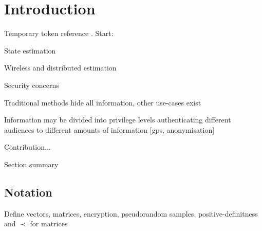 \documentclass[conference]{IEEEtran}
\theoremstyle{definition}
\theoremstyle{definition}
\theoremstyle{remark}
\begin{document}

\IEEEpeerreviewmaketitle

% 
%                                                        
%                                                        
%                                                        
% 

\section{Introduction}
Temporary token reference \cite{katzIntroductionModernCryptography2008}. Start:

State estimation

Wireless and distributed estimation

Security concerns

Traditional methods hide all information, other use-cases exist

Information may be divided into privilege levels authenticating different audiences to different amounts of information [gps, anonymisation]

Contribution...

Section summary

\subsection{Notation}
Define vectors, matrices, encryption, pseudorandom samples, positive-definitness and $\prec$ for matrices


% 
%                                              
%                                              
%                                              
% 
\end{document}
